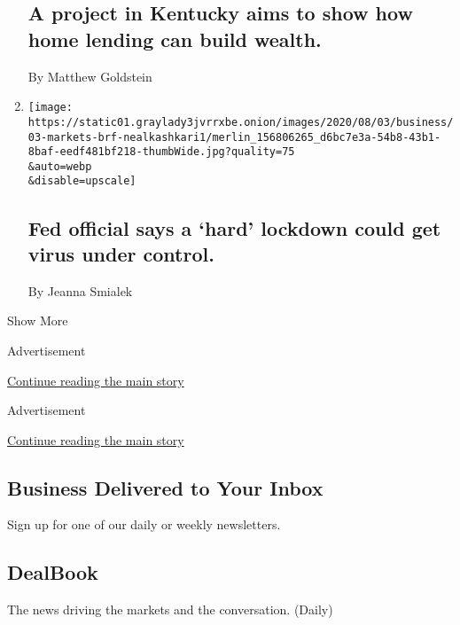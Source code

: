 \begin{enumerate}
  \hypertarget{a-project-in-kentucky-aims-to-show-how-home-lending-can-build-wealth}{%
  \subsection{A project in Kentucky aims to show how home lending can
  build
  wealth.}\label{a-project-in-kentucky-aims-to-show-how-home-lending-can-build-wealth}}

  By Matthew Goldstein
\item
  \href{/2020/08/03/business/fed-official-says-a-hard-lockdown-could-get-virus-under-control.html}{}

  \texttt{[image: https://static01.graylady3jvrrxbe.onion/images/2020/08/03/business/03-markets-brf-nealkashkari1/merlin\_156806265\_d6bc7e3a-54b8-43b1-8baf-eedf481bf218-thumbWide.jpg?quality=75\\\&auto=webp\\\&disable=upscale]}

  \hypertarget{fed-official-says-a-hard-lockdown-could-get-virus-under-control}{%
  \subsection{Fed official says a `hard' lockdown could get virus under
  control.}\label{fed-official-says-a-hard-lockdown-could-get-virus-under-control}}

  By Jeanna Smialek
\end{enumerate}

Show More

Advertisement

\protect\hyperlink{after-mid2}{Continue reading the main story}

Advertisement

\protect\hyperlink{after-mktg}{Continue reading the main story}

\hypertarget{business-delivered-to-your-inbox}{%
\subsection{Business Delivered to Your
Inbox}\label{business-delivered-to-your-inbox}}

Sign up for one of our daily or weekly newsletters.

\hypertarget{dealbook}{%
\subsection{DealBook}\label{dealbook}}

The news driving the markets and the conversation. (Daily)

